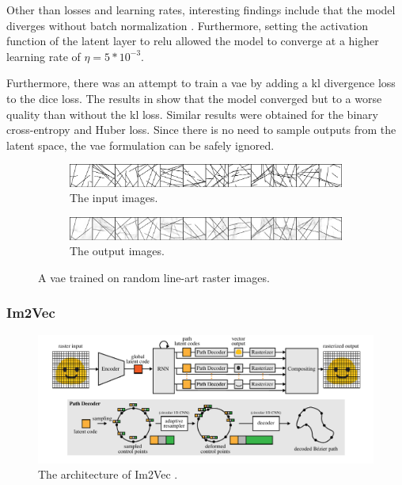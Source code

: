 Other than losses and learning rates, interesting findings include that the model diverges without batch normalization \citep{pmlr-v37-ioffe15}. Furthermore, setting the activation function of the latent layer to \gls{relu} allowed the model to converge at a higher learning rate of $\eta=5*10^{-3}$.

Furthermore, there was an attempt to train a \gls{vae} by adding a \gls{kl} divergence \citep{10.1214/aoms/1177729694} loss to the dice loss. The results in  show that the model converged but to a worse quality than without the \gls{kl} loss. Similar results were obtained for the binary cross-entropy and Huber loss. Since there is no need to sample outputs from the latent space, the \gls{vae} formulation can be safely ignored.

\begin{figure}
    \centering
    \begin{subfigure}{\textwidth}
        \includegraphics[width=\textwidth]{graphics/work-artifacts/vae/109/real_img_VanillaVAE_336-0.png}
        \caption{The input images.}
    \end{subfigure}
    \begin{subfigure}{\textwidth}
        \includegraphics[width=\textwidth]{graphics/work-artifacts/vae/109/recons_VanillaVAE_336-0.png}
        \caption{The output images.}
    \end{subfigure}
    \caption{A \gls{vae} trained on random line-art raster images.}
    \label{fig:vae.109}
\end{figure}

\subsubsection{Im2Vec}
\label{subsec:early.im2vec}

\begin{figure}
    \centering
    \includegraphics[width=\textwidth]{graphics/im2vec/arch.pdf}
    \caption{The architecture of Im2Vec \citep{DBLP:conf/cvpr/Reddy21}.}
    \label{fig:im2vec.arch}
\end{figure}

